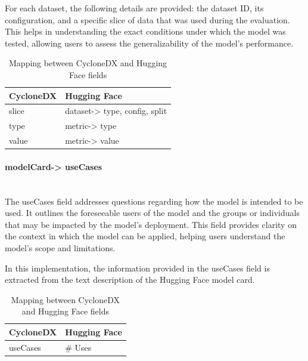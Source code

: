\documentclass[12pt,a4paper, oneside, openright]{book}
\begin{document}
For each dataset, the following details are provided: the dataset ID, its configuration, and a specific slice of data that was used during the evaluation. This helps in understanding the exact conditions under which the model was tested, allowing users to assess the generalizability of the model's performance.

\begin{table}[h!]
    \centering
    \begin{tabular}{|p{7cm}|p{6cm}|}
        \hline
        \textbf{CycloneDX} & \textbf{Hugging Face}\\ \hline
        
           slice   
           & dataset-> type, config, split
        \\ \hline
             type
            & metric-> type
        \\ \hline
             value
            &  metric-> value
        \\ \hline   

            
 
    \end{tabular}
\caption{Mapping between CycloneDX and Hugging Face fields}
    \label{tab:cyclonedx_huggingface}
\end{table}




\paragraph{modelCard-> useCases} \mbox{} \\
The useCases field addresses questions regarding how the model is intended to be used. It outlines the foreseeable users of the model and the groups or individuals that may be impacted by the model's deployment. This field provides clarity on the context in which the model can be applied, helping users understand the model's scope and limitations.

In this implementation, the information provided in the useCases field is extracted from the text description of the Hugging Face model card.
\begin{table}[h!]
    \centering
    \begin{tabular}{|p{7cm}|p{6cm}|}
        \hline
        \textbf{CycloneDX} & \textbf{Hugging Face} \\ \hline
           useCases   
           & \# Uses
        \\ \hline     
    \end{tabular}
\caption{Mapping between CycloneDX and Hugging Face fields}
    \label{tab:cyclonedx_huggingface}
\end{table}
\end{document}

